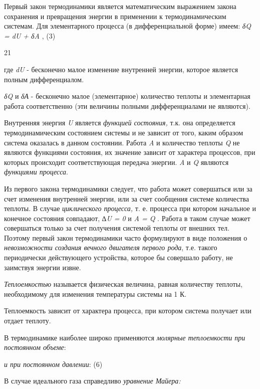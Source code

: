 Первый закон термодинамики является математическим выражением закона
сохранения и превращения энергии в применении к термодинамическим
системам. Для элементарного процесса (в дифференциальной форме) имеем:
\emph{δQ = dU + δA} , (3)

21

где \emph{dU} - бесконечно малое изменение внутренней энергии, которое
является полным дифференциалом.

\emph{δQ} и \emph{δА} - бесконечно малое (элементарное) количество
теплоты и элементарная работа соответственно (эти величины полными
дифференциалами не являются).

Внутренняя энергия \emph{U} является \emph{функцией состояния,} т.к. она
определяется термодинамическим состоянием системы и не зависит от того,
каким образом система оказалась в данном состоянии. Работа \emph{A} и
количество теплоты \emph{Q} не являются функциями состояния, их значение
зависит от характера процессов, при которых происходит соответствующая
передача энергии. \emph{A} и \emph{Q} являются \emph{функциями
процесса}.

Из первого закона термодинамики следует, что работа может совершаться
или за счет изменения внутренней энергии, или за счет сообщения системе
количества теплоты. В случае \emph{циклического процесса,} т. е.
процесса при котором начальное и конечное состояния совпадают, \emph{∆U
= 0} и \emph{A = Q} . Работа в таком случае может совершаться только за
счет получения системой теплоты от внешних тел. Поэтому первый закон
термодинамики часто формулируют в виде положения о \emph{невозможности
создания вечного двигателя первого рода}, т.е. такого периодически
действующего устройства, которое бы совершало работу, не заимствуя
энергии извне.

\emph{Теплоемкостью} называется физическая величина, равная количеству
теплоты, необходимому для изменения температуры системы на 1 К.


Теплоемкость зависит от характера процесса, при котором система получает
или отдает теплоту.

В термодинамике наиболее широко применяются \emph{молярные теплоемкости
при постоянном объеме}: %

\emph{и при постоянном давлении}: %
(6)

В случае идеального газа справедливо \emph{уравнение Майера:}

